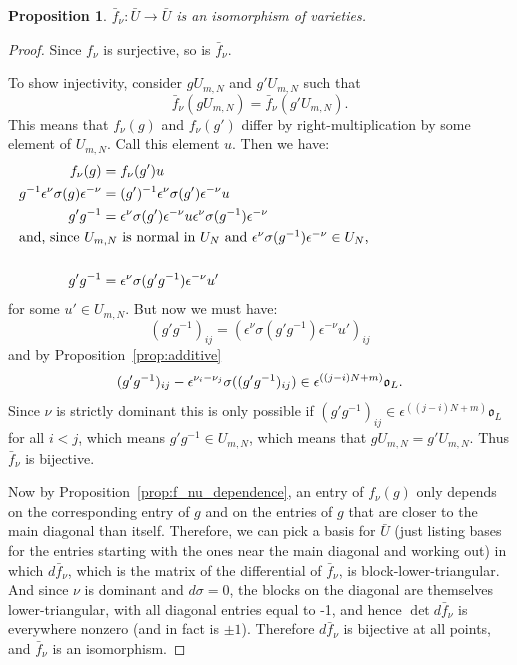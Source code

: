 \documentclass{amsart}
\newtheorem{prop}{Proposition}[subsection]
\theoremstyle{definition}
\def\O{\mathfrak{o}}
\def\e{\epsilon}
\def\s{\sigma}
\def\en{\e^{\nu}}
\def\enm{\e^{-\nu}}
\def\f{f_\nu}
\def\ff{\bar{f}_\nu}
\def\Umn{U_{m,N}}
\def\U{\bar{U}}
\begin{document}
  \begin{prop}
    \label{prop:isomorphism}
    $\ff : \U \to \U$ is an isomorphism of varieties.
  \end{prop}
  \begin{proof}
    Since $\f$ is surjective, so is $\ff$. 

    To show injectivity, consider $g\Umn$ and $g'\Umn$ such that
    \begin{equation*}
      \ff(g\Umn) = \ff(g'\Umn).
    \end{equation*}
    This means that $\f(g)$ and $\f(g')$ differ by
    right-multiplication by some element of $\Umn$.  Call this element $u$.
    Then we have:
    \begin{align}
    \f(g) &= \f(g')u \nonumber \\
    g^{-1}\en\s(g)\enm &= (g')^{-1}\en\s(g')\enm u \nonumber \\
    g' g^{-1} &= \en\s(g')\enm u \en\s(g^{-1})\enm \nonumber \\
    \noalign{\noindent and, since $\Umn$ is normal in $U_N$ and
      $\en\s(g^{-1})\enm \in U_N$,} \nonumber \\
    \label{eq:differ_by_u}
    g' g^{-1} &= \en\s(g' g^{-1})\enm u'
    \end{align}
    for some $u' \in \Umn$.  But now we must have:
    \begin{equation*}
      (g'g^{-1})_{ij} = (\en\s(g' g^{-1})\enm u')_{ij}
    \end{equation*}
    and by Proposition~\ref{prop:additive}
    \begin{equation*}
      (g'g^{-1})_{ij} - \e^{\nu_i - \nu_j}\s((g'g^{-1})_{ij}) \in \e^{((j-i)N+m)}\O_L. \\
    \end{equation*}
    Since $\nu$ is strictly dominant this is only possible if $(g'g^{-1})_{ij}
    \in \e^{((j-i)N+m)}\O_L$ for all $i < j$, which means $g' g^{-1} \in
    \Umn$, which means that $g\Umn = g'\Umn$.  Thus $\ff$ is bijective.
    
    Now by Proposition~\ref{prop:f_nu_dependence}, an entry of $\f(g)$ only
    depends on the corresponding entry of $g$ and on the entries of $g$ that
    are closer to the main diagonal than itself.  Therefore, we can pick a
    basis for $\U$ (just listing bases for the entries starting with the ones
    near the main diagonal and working out) in which $d\ff$, which is the
    matrix of the differential of $\ff$, is block-lower-triangular.  And since
    $\nu$ is dominant and $d\s = 0$, the blocks on the diagonal are themselves
    lower-triangular, with all diagonal entries equal to -1, and hence $\det
    d\ff$ is everywhere nonzero (and in fact is $\pm 1$).  Therefore $d\ff$ is
    bijective at all points, and $\ff$ is an isomorphism.
  \end{proof}
\end{document}
